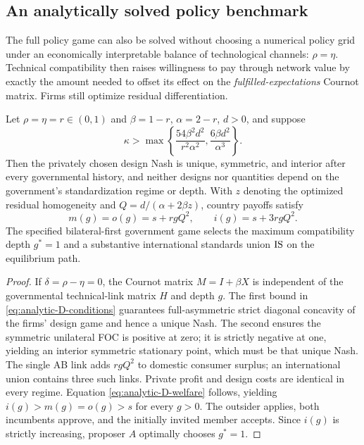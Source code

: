 \subsection{An analytically solved policy benchmark}\label{sec:balanced-policy}

The full policy game can also be solved without choosing
a numerical policy grid under an economically interpretable
balance of technological channels: $\rho=\eta$.
Technical compatibility then raises willingness to pay
through network value by exactly the amount needed
to offset its effect on the \emph{fulfilled-expectations}
Cournot matrix. Firms still optimize residual differentiation.

\begin{proposition}\label{prop:analytic-D}
Let $\rho=\eta=r\in(0,1)$ and $\beta=1-r$,
$\alpha=2-r$, $d>0$, and suppose
\begin{equation}\label{eq:analytic-D-conditions}
 \kappa>
 \max\left\{
 \frac{54\beta^2d^2}{r^2\alpha^2},
 \frac{6\beta d^2}{\alpha^3}
 \right\}.
\end{equation}
Then the privately chosen design Nash is unique,
symmetric, and interior after every governmental history,
and neither designs nor quantities depend on the
government's standardization regime or depth.
With $z$ denoting the optimized residual homogeneity
and $Q=d/(\alpha+2\beta z)$, country payoffs satisfy
\begin{equation}\label{eq:analytic-D-welfare}
 m(g)=o(g)=s+r gQ^2,\qquad
 i(g)=s+3r gQ^2.
\end{equation}
The specified bilateral-first government game selects
the maximum compatibility depth $g^*=1$ and a substantive
international standards union $\mathrm{IS}$ on the equilibrium path.
\end{proposition}

\begin{proof}
If $\delta=\rho-\eta=0$, the Cournot matrix
$M=I+\beta X$ is independent of the governmental
technical-link matrix $H$ and depth $g$.
The first bound in \eqref{eq:analytic-D-conditions}
guarantees full-asymmetric strict diagonal concavity
of the firms' design game and hence a unique Nash.
The second ensures the symmetric unilateral FOC
is positive at zero; it is strictly negative at one,
yielding an interior symmetric stationary point,
which must be that unique Nash.
The single AB link adds $rgQ^2$ to domestic
consumer surplus; an international union contains
three such links. Private profit and design costs
are identical in every regime. Equation
\eqref{eq:analytic-D-welfare} follows, yielding
$i(g)>m(g)=o(g)>s$ for every $g>0$.
The outsider applies, both incumbents approve,
and the initially invited member accepts.
Since $i(g)$ is strictly increasing, proposer
$A$ optimally chooses $g^*=1$.
\end{proof}

